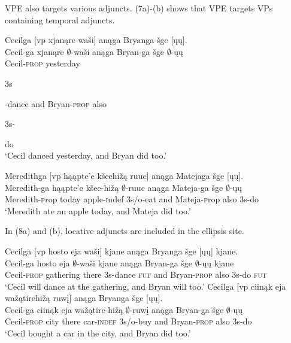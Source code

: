 \documentclass[output=paper]{LSP/langsci}
\begin{document}
VPE also targets various adjuncts. (7a)-(b) shows that VPE targets VPs containing temporal adjuncts. 

\begin{exe}
\ex
\begin{xlist}
\ex
\glll Cecilga {\textsc [vp} xjan\k{a}re wa\v{s}i{\textsc ]} an\k{a}ga Bryanga \v{s}ge {\textsc [}\k{u}\k{u}{\textsc ]}.\\
Cecil-ga {} xjan\k{a}re $\emptyset$-wa\v{s}i an\k{a}ga Bryan-ga \v{s}ge $\emptyset$-\k{u}\k{u}\\
Cecil-\textsc{prop} {} yesterday \begin{sc}3s\end{sc}-dance and Bryan-\textsc{prop} also \begin{sc}3s-\end{sc}do\\
\trans `Cecil danced yesterday, and Bryan did too.'

\ex
\glll Meredithga  {\textsc [vp} h\k{a}\k{a}pte'e k\v{s}eehi\v{z}\k{a} ruuc{\textsc ]} an\k{a}ga Matejaga \v{s}ge {\textsc [}\k{u}\k{u}{\textsc ]}.\\
Meredith-ga {} h\k{a}\k{a}pte'e k\v{s}ee-hi\v{z}\k{a} $\emptyset$-ruuc an\k{a}ga Mateja-ga \v{s}ge $\emptyset$-\k{u}\k{u}\\
Meredith-{\textsc prop} {} today apple-{\textsc indef} {\textsc 3s/o}-eat and Mateja-{\textsc prop} also {\textsc 3s}-do\\
\trans `Meredith ate an apple today, and Mateja did too.'
\end{xlist}
\end{exe}

In (8a) and (b), locative adjuncts are included in the ellipsis site. 

\begin{exe}
\ex
\begin{xlist}
\ex
\glll Cecilga {\textsc [vp} hosto eja wa\v{s}i{\textsc ]} kjane an\k{a}ga Bryanga \v{s}ge {\textsc [}\k{u}\k{u}{\textsc ]} kjane.\\
Cecil-ga {} hosto eja $\emptyset$-wa\v{s}i kjane an\k{a}ga Bryan-ga \v{s}ge $\emptyset$-\k{u}\k{u} kjane\\
Cecil-\textsc{prop} {} gathering there {\textsc 3s}-dance \textsc{fut} and Bryan-\textsc{prop} also {\textsc 3s}-do \textsc{fut}\\
\trans `Cecil will dance at the gathering, and Bryan will too.'
\ex
\glll Cecilga {\textsc [vp} ciin\k{a}k eja wa\v{z}\k{a}tirehi\v{z}\k{a} ruw\k{i}{\textsc ]} an\k{a}ga Bryanga \v{s}ge {\textsc [}\k{u}\k{u}{\textsc ]}.\\
Cecil-ga {} ciin\k{a}k eja wa\v{z}\k{a}tire-hi\v{z}\k{a} $\emptyset$-ruw\k{i} an\k{a}ga Bryan-ga \v{s}ge $\emptyset$-\k{u}\k{u}\\
Cecil-\textsc{prop} {} city there car-\textsc{indef} {\textsc 3s/o}-buy and Bryan-\textsc{prop} also {\textsc 3s}-do\\
\trans `Cecil bought a car in the city, and Bryan did too.'
\end{xlist}
\end{exe}
\end{document}
